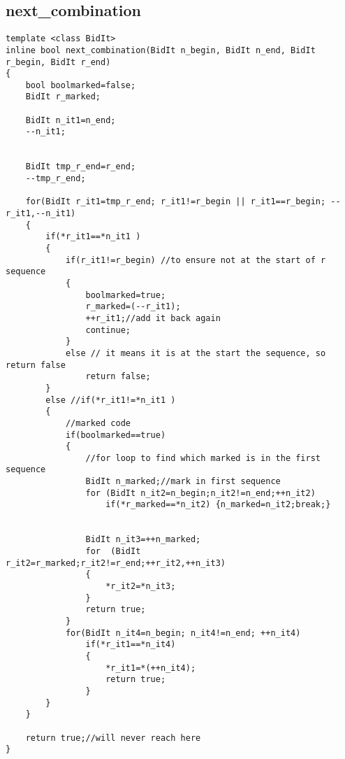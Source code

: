 \subsection{next\_combination}
\label{app:nextcombination}
\begin{verbatim}
template <class BidIt>
inline bool next_combination(BidIt n_begin, BidIt n_end, BidIt r_begin, BidIt r_end)
{
    bool boolmarked=false;
    BidIt r_marked;

    BidIt n_it1=n_end;
    --n_it1;


    BidIt tmp_r_end=r_end;
    --tmp_r_end;

    for(BidIt r_it1=tmp_r_end; r_it1!=r_begin || r_it1==r_begin; --r_it1,--n_it1)
    {
        if(*r_it1==*n_it1 )
        {
            if(r_it1!=r_begin) //to ensure not at the start of r sequence
            {
                boolmarked=true;
                r_marked=(--r_it1);
                ++r_it1;//add it back again 
                continue;
            }
            else // it means it is at the start the sequence, so return false
                return false;      
        }
        else //if(*r_it1!=*n_it1 )
        {
            //marked code
            if(boolmarked==true)
            {
                //for loop to find which marked is in the first sequence
                BidIt n_marked;//mark in first sequence
                for (BidIt n_it2=n_begin;n_it2!=n_end;++n_it2)
                    if(*r_marked==*n_it2) {n_marked=n_it2;break;}


                BidIt n_it3=++n_marked;    
                for  (BidIt r_it2=r_marked;r_it2!=r_end;++r_it2,++n_it3)
                {
                    *r_it2=*n_it3;
                }
                return true;
            }
            for(BidIt n_it4=n_begin; n_it4!=n_end; ++n_it4)
                if(*r_it1==*n_it4)
                {
                    *r_it1=*(++n_it4);
                    return true;           
                }
        }
    }  

    return true;//will never reach here    
}
\end{verbatim}

\twocolumn


